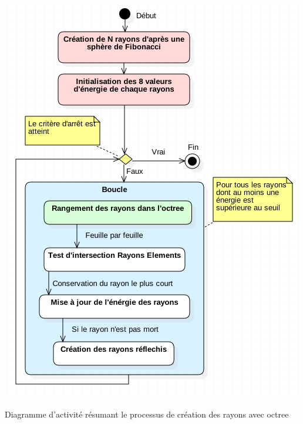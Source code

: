 %	
%
%
%

\begin{figureth}
	\includegraphics[width=0.7\linewidth]{images/DiagRay2}
	\caption{Diagramme d'activité résumant le processus de création des rayons avec \gls{octree}}
	\label{DiagRay2}
\end{figureth}	

